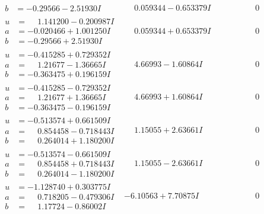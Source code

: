 \documentclass[1p]{elsarticle_modified}
\theoremstyle{definition}
\begin{document}
$$\begin{array}{c|c|c}
\begin{aligned}
b &= -0.29566 - 2.51930 I\end{aligned}
 & \phantom{-}0.059344 - 0.653379 I & \phantom{-0.000000 } 0 \\ \hline\begin{aligned}
u &= \phantom{-}1.141200 - 0.200987 I \\
a &= -0.020466 + 1.001250 I \\
b &= -0.29566 + 2.51930 I\end{aligned}
 & \phantom{-}0.059344 + 0.653379 I & \phantom{-0.000000 } 0 \\ \hline\begin{aligned}
u &= -0.415285 + 0.729352 I \\
a &= \phantom{-}1.21677 - 1.36665 I \\
b &= -0.363475 + 0.196159 I\end{aligned}
 & \phantom{-}4.66993 - 1.60864 I & \phantom{-0.000000 } 0 \\ \hline\begin{aligned}
u &= -0.415285 - 0.729352 I \\
a &= \phantom{-}1.21677 + 1.36665 I \\
b &= -0.363475 - 0.196159 I\end{aligned}
 & \phantom{-}4.66993 + 1.60864 I & \phantom{-0.000000 } 0 \\ \hline\begin{aligned}
u &= -0.513574 + 0.661509 I \\
a &= \phantom{-}0.854458 - 0.718443 I \\
b &= \phantom{-}0.264014 + 1.180200 I\end{aligned}
 & \phantom{-}1.15055 + 2.63661 I & \phantom{-0.000000 } 0 \\ \hline\begin{aligned}
u &= -0.513574 - 0.661509 I \\
a &= \phantom{-}0.854458 + 0.718443 I \\
b &= \phantom{-}0.264014 - 1.180200 I\end{aligned}
 & \phantom{-}1.15055 - 2.63661 I & \phantom{-0.000000 } 0 \\ \hline\begin{aligned}
u &= -1.128740 + 0.303775 I \\
a &= \phantom{-}0.718205 - 0.479306 I \\
b &= \phantom{-}1.17724 - 0.86002 I\end{aligned}
 & -6.10563 + 7.70875 I & \phantom{-0.000000 } 0 \\ \hline\begin{aligned}

\end{aligned}
\end{array}$$
\end{document}
